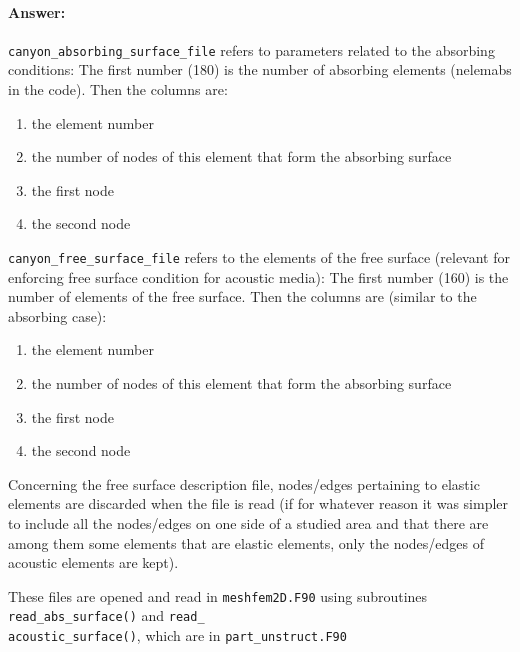 \documentclass[oneside,english,onecolumn,letterpaper]{book}
\begin{document}
\paragraph{Answer:} \texttt{canyon\_absorbing\_surface\_file} refers to parameters related to the
absorbing conditions:
The first number (180) is the number of absorbing elements (nelemabs in the
code).
Then the columns are:
\begin{enumerate}[wide=1em, label=column \arabic*:]
\item the element number
\item the number of nodes of this element that form the absorbing surface
\item the first node
\item the second node
\end{enumerate}

\texttt{canyon\_free\_surface\_file} refers to the elements of the free surface
(relevant for enforcing free surface condition for acoustic media):
The first number (160) is the number of  elements of the free surface.
Then the columns are (similar to the absorbing case):
\begin{enumerate}[wide=1em, label=column \arabic*:]
\item the element number
\item the number of nodes of this element that form the absorbing surface
\item the first node
\item the second node
\end{enumerate}

Concerning the free surface description file, nodes/edges pertaining to
elastic elements are discarded when the file is read (if for whatever
reason it was simpler to include all the nodes/edges on one side of a
studied area and that there are among them some elements that are
elastic elements, only the nodes/edges of acoustic elements are kept).

These files are opened and read in \texttt{meshfem2D.F90} using subroutines
\texttt{read\_abs\_surface()} and \texttt{read\_}~\\
\texttt{acoustic\_surface()}, which are in \texttt{part\_unstruct.F90}

\end{document}
